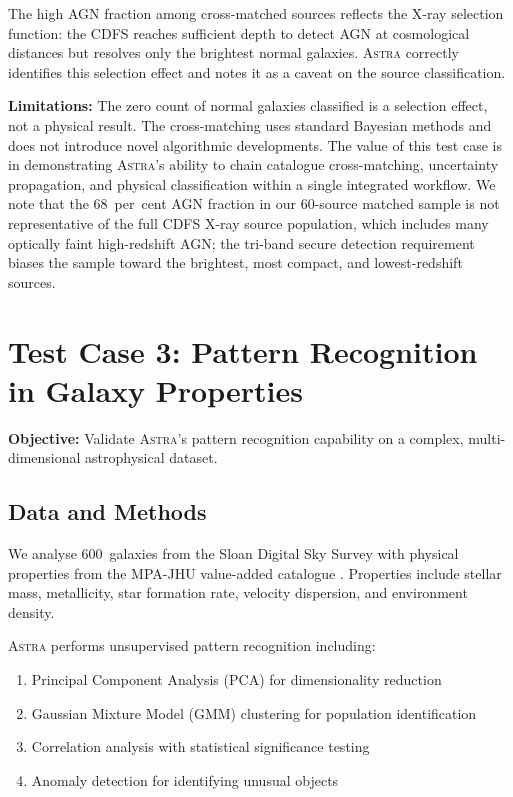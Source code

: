\documentclass[usenatbib]{rasti}
\newcommand{\astra}{\textsc{Astra}\xspace}
\begin{document}
The high AGN fraction among cross-matched sources reflects the X-ray selection function: the CDFS reaches sufficient depth to detect AGN at cosmological distances but resolves only the brightest normal galaxies.
\astra correctly identifies this selection effect and notes it as a caveat on the source classification.

\textbf{Limitations:} The zero count of normal galaxies classified is a selection effect, not a physical result.
The cross-matching uses standard Bayesian methods and does not introduce novel algorithmic developments.
The value of this test case is in demonstrating \astra's ability to chain catalogue cross-matching, uncertainty propagation, and physical classification within a single integrated workflow.
We note that the 68~per~cent AGN fraction in our 60-source matched sample is not representative of the full CDFS X-ray source population, which includes many optically faint high-redshift AGN; the tri-band secure detection requirement biases the sample toward the brightest, most compact, and lowest-redshift sources.

\section{Test Case 3: Pattern Recognition in Galaxy Properties}
\label{sec:tc3}

\textbf{Objective:} Validate \astra's pattern recognition capability on a complex, multi-dimensional astrophysical dataset.

\subsection{Data and Methods}
\label{sec:tc3:data}

We analyse 600~galaxies from the Sloan Digital Sky Survey \citep[SDSS;][]{Abazajian2009} with physical properties from the MPA-JHU value-added catalogue \citep{Brinchmann2004}.
Properties include stellar mass, metallicity, star formation rate, velocity dispersion, and environment density.

\astra performs unsupervised pattern recognition including:
\begin{enumerate}
  \item[(i)] Principal Component Analysis (PCA) for dimensionality reduction
  \item[(ii)] Gaussian Mixture Model (GMM) clustering for population identification
  \item[(iii)] Correlation analysis with statistical significance testing
  \item[(iv)] Anomaly detection for identifying unusual objects
\end{enumerate}
\end{document}
